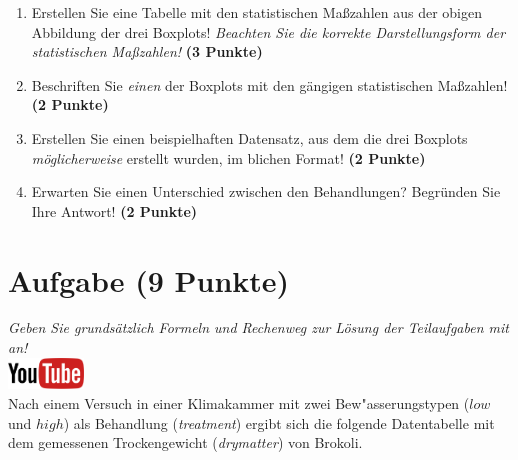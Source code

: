 \documentclass[a4paper, 9pt]{scrartcl}\usepackage[]{graphicx}\usepackage[]{xcolor}
\begin{document}
\begin{enumerate}
\item Erstellen Sie eine Tabelle mit den statistischen Ma{\ss}zahlen aus der
  obigen Abbildung der drei Boxplots! \textit{Beachten Sie die korrekte
    Darstellungsform der statistischen Ma{\ss}zahlen!} \textbf{(3 Punkte)}
\item Beschriften Sie \textit{einen} der Boxplots mit den g{\"a}ngigen
  statistischen Ma{\ss}zahlen! \textbf{(2 Punkte)}
\item Erstellen Sie einen beispielhaften Datensatz, aus dem die drei
  Boxplots \textit{m{\"o}glicherweise} erstellt wurden, im blichen Format! \textbf{(2 Punkte)}
\item Erwarten Sie einen Unterschied zwischen den Behandlungen? Begr{\"u}nden
  Sie Ihre Antwort! \textbf{(2 Punkte)}
\end{enumerate} 
\clearpage

\section{Aufgabe \hfill (9 Punkte)}

\textit{Geben Sie grunds{\"a}tzlich Formeln und Rechenweg zur L{\"o}sung der
  Teilaufgaben mit an!} \\[1Ex]

\hfill\href{https://youtu.be/0xc0jIPeiyw}{\includegraphics[width =
  2cm]{img/youtube}}\\[1Ex]



Nach einem Versuch in einer Klimakammer mit zwei Bew{"a}sserungstypen ($low$ und $high$) als Behandlung
(\textit{treatment}) ergibt sich die folgende Datentabelle mit dem
gemessenen Trockengewicht (\textit{drymatter}) von Brokoli.
\end{document}
